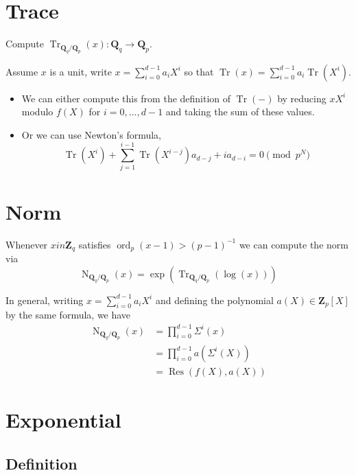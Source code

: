 \documentclass[a4paper,11pt]{article}
\theoremstyle{definition}
\DeclareMathOperator{\Res}{Res}
\DeclareMathOperator{\trace}{Tr}
\DeclareMathOperator{\norm}{N}
\DeclareMathOperator{\ord}{ord}
\begin{document}
\section{Trace}

Compute $\trace_{\mathbf{Q}_q/\mathbf{Q}_p}(x) \colon \mathbf{Q}_q \to \mathbf{Q}_p$.

Assume $x$ is a unit, write $x = \sum_{i=0}^{d-1} a_i X^i$ so that 
$\trace(x) = \sum_{i=0}^{d-1} a_i \trace(X^i)$.

\begin{itemize}
\item We can either compute this from the definition of $\trace(-)$ by reducing 
      $x X^i$ modulo $f(X)$ for $i = 0, \dotsc, d-1$ and taking the sum of these 
      values.
\item Or we can use Newton's formula,
      \begin{equation}
      \trace(X^i) + \sum_{j=1}^{i-1} \trace(X^{i-j}) a_{d-j} + i a_{d-i} = 0 \pmod{p^N}
      \end{equation}
\end{itemize}

\section{Norm}

Whenever $x in \mathbf{Z}_q$ satisfies $\ord_p(x-1) > (p-1)^{-1}$ we can 
compute the norm via
\begin{equation}
\norm_{\mathbf{Q}_q / \mathbf{Q}_p} (x) 
= \exp (\trace_{\mathbf{Q}_q / \mathbf{Q}_p} (\log (x)))
\end{equation}

In general, writing $x = \sum_{i=0}^{d-1} a_i X^i$ and defining 
the polynomial $a(X) \in \mathbf{Z}_p[X]$ by the same formula, we have 
\begin{align}
\norm_{\mathbf{Q}_q/\mathbf{Q}_p} (x) & = \prod_{i=0}^{d-1} \Sigma^i (x) \\
                                      & = \prod_{i=0}^{d-1} a(\Sigma^i(X)) \\
                                      & = \Res(f(X), a(X))
\end{align}

\section{Exponential}

\subsection{Definition}
\end{document}
